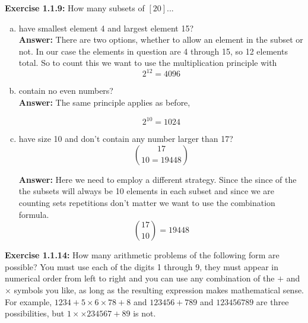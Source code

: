 \documentclass{amsart}
\begin{document}
\noindent\textbf{Exercise 1.1.9: } How many subsets of $[20]$...\\
\begin{enumerate}[(a)]
\item have smallest element 4 and largest element 15?\\

\noindent \textbf{Answer:}
There are two options, whether to allow an element in the subset or not. In our case the elements in question are 4 through 15, so 12 elements total. So to count this we want to use the multiplication principle with 
\begin{equation}
2^12=4096
\end{equation}

\vspace{1in}

\item contain no even numbers?\\

\noindent \textbf{Answer:}
The same principle applies as before,

\begin{equation}
2^10=1024
\end{equation}

\vspace{1in}

\item have size 10 and don't contain any number larger than 17?\\

\begin{equation}
17\choose10= 19448

\end{equation}

\vspace{1in}





\noindent \textbf{Answer:}
Here we need to employ a different strategy. Since the since of the the subsets will always be 10 elements in each subset and since we are counting sets repetitions don't matter we want to use the combination formula.
\begin{equation}
{17\choose10} = 19448
\end{equation}




\vspace{1in}
\end{enumerate}

\noindent\textbf{Exercise 1.1.14: } How many arithmetic problems of the following form are possible? You must use each of the digits 1 through 9, they must appear in numerical order from left to right and you can use any combination of the $+$ and $\times$ symbols you like, as long as the resulting expression makes mathematical sense. For example, $1234+5 \times 6 \times 78+8$ and $123456+789$ and $123456789$ are three possibilities, but $1 \times \times 234567+89$ is not.\\
\end{document}
